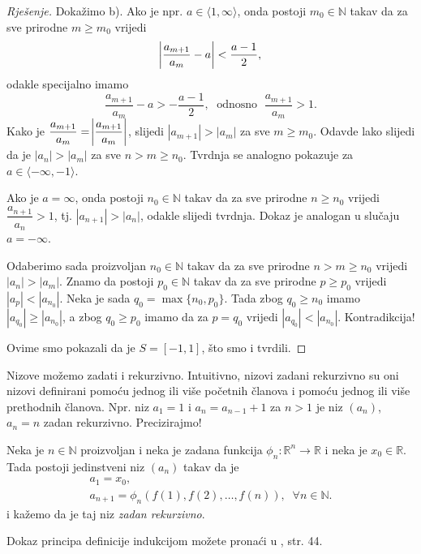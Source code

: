 \begin{proof}[Rješenje]
Dokažimo b). Ako je npr. $a\in \langle 1, \infty\rangle$, onda postoji $m_0\in \mathbb{N}$ takav da za sve prirodne $m\geq m_0$ vrijedi $$\abs{\dfrac{a_{m+1}}{a_m}-a}<\dfrac{a-1}{2},$$
odakle specijalno imamo
$$\dfrac{a_{m+1}}{a_m}-a>-\dfrac{a-1}{2},\;\text{ odnosno }\; \dfrac{a_{m+1}}{a_m}>1.$$
Kako je $\dfrac{a_{m+1}}{a_m}=\abs{\dfrac{a_{m+1}}{a_m}}$, slijedi $|a_{m+1}|>|a_m|$ za sve $m\geq m_0$. Odavde lako slijedi da je $|a_{n}|>|a_m|$ za sve $n>m\geq n_0$. Tvrdnja se analogno pokazuje za $a\in \langle -\infty, -1\rangle$.

Ako je $a=\infty$, onda postoji $n_0\in \mathbb{N}$ takav da za sve prirodne $n\geq n_0$ vrijedi $\dfrac{a_{n+1}}{a_n}>1$, tj. $|a_{n+1}|>|a_n|$, odakle slijedi tvrdnja. Dokaz je analogan u slučaju $a=-\infty$.

Odaberimo sada proizvoljan $n_0\in \mathbb{N}$ takav da za sve prirodne $n>m\geq n_0$ vrijedi $|a_n|>|a_m|$. Znamo da postoji $p_0\in \mathbb{N}$ takav da za sve prirodne $p\geq p_0$ vrijedi $|a_p|<|a_{n_0}|$. Neka je sada $q_0=\max\{n_0, p_0\}$. Tada zbog $q_0\geq n_0$ imamo $|a_{q_0}|\geq |a_{n_0}|$, a zbog $q_0\geq p_0$ imamo da za $p=q_0$ vrijedi $|a_{q_0}|<|a_{n_0}|$. Kontradikcija!

Ovime smo pokazali da je $S=[-1, 1]$, što smo i tvrdili.
\end{proof}
Nizove možemo zadati i rekurzivno. Intuitivno, nizovi zadani rekurzivno su oni nizovi definirani pomoću jednog ili više početnih članova i pomoću jednog ili više prethodnih članova. Npr. niz $a_1=1$ i $a_n=a_{n-1}+1$ za $n>1$ je niz $(a_n)$, $a_n=n$ zadan rekurzivno. Precizirajmo!
\begin{remark}
Neka je $n\in \mathbb{N}$ proizvoljan i neka je zadana funkcija $\phi_n : \mathbb{R}^n\to \mathbb{R}$ i neka je $x_0\in \mathbb{R}$. Tada postoji jedinstveni niz $(a_n)$ takav da je
\begin{gather*}
a_1=x_0,\\
a_{n+1}=\phi_n\left( f(1), f(2), \dots, f(n)\right),\;\; \forall n\in \mathbb{N}.
\end{gather*}
i kažemo da je taj niz \textit{zadan rekurzivno}. 
\end{remark} 
Dokaz principa definicije indukcijom možete pronaći u \cite{9}, str. 44.

